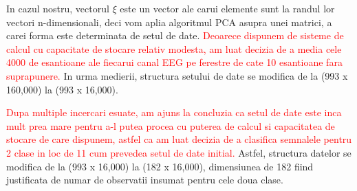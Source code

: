 In cazul nostru, vectorul $ \xi $ este un vector ale carui elemente sunt la
randul lor vectori n-dimensionali, deci vom aplia algoritmul PCA asupra unei matrici,
a carei forma este determinata de setul de date.
\textcolor{red}{Deoarece dispunem de sisteme de calcul cu capacitate de stocare 
relativ modesta, am luat decizia de a media cele 4000 de esantioane ale fiecarui
canal EEG pe ferestre de cate 10 esantioane fara suprapunere.} In urma medierii,
structura setului de date se modifica de la (993 x 160,000) la (993 x 16,000).


\textcolor{red}{Dupa multiple incercari esuate, am ajuns la concluzia ca setul de date
este inca mult prea mare pentru a-l putea procea cu puterea de calcul si capacitatea
de stocare de care dispunem, astfel ca am luat decizia de a clasifica semnalele 
pentru 2 clase in loc de 11 cum prevedea setul de date initial.} Astfel, structura
datelor se modifica de la (993 x 16,000) la (182 x 16,000), dimensiunea de 182
fiind justificata de numar de observatii insumat pentru cele doua clase.
